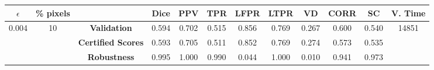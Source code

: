 \begin{longtable}{ c  c | c | c  c  c  c  c  c  c c c}
\toprule \textbf{$\epsilon$} & \textbf{\% pixels} & & \textbf{Dice} & \textbf{PPV} & \textbf{TPR} & \textbf{LFPR} & \textbf{LTPR} & \textbf{VD} & \textbf{CORR} & \textbf{SC} & \textbf{V. Time} \\
\midrule 
\multirow{3}{*}{0.004}  & \multirow{3}{*}{10} &\textbf{Validation} & 0.594 & 0.702 & 0.515 & 0.856 & 0.769 & 0.267 & 0.600 & 0.540 & \multirow{3}{*}{14851} \\
 & & \textbf{Certified Scores} & 0.593 & 0.705 & 0.511 & 0.852 & 0.769 & 0.274 & 0.573 & 0.535 & \\
& & \textbf{Robustness} & 0.995 & 1.000 & 0.990 & 0.044 & 1.000 & 0.010 & 0.941 & 0.973 & \\
\end{longtable}